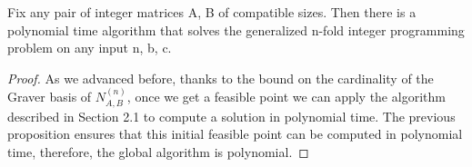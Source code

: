 \begin{theorem}
Fix any pair of integer matrices A, B of compatible sizes. Then there is a polynomial time algorithm that solves the generalized n-fold integer programming problem on any input n, b, c.
\end{theorem}
\vspace{-20pt}
\begin{proof}
As we advanced before, thanks to the bound on the cardinality of the  Graver basis of $N_{A,B}^{(n)}$, once we get a feasible point we can apply the algorithm described in Section 2.1 to compute a solution in polynomial time. The previous proposition ensures that this initial feasible point can be computed in polynomial time, therefore, the global algorithm is polynomial.
\end{proof}


